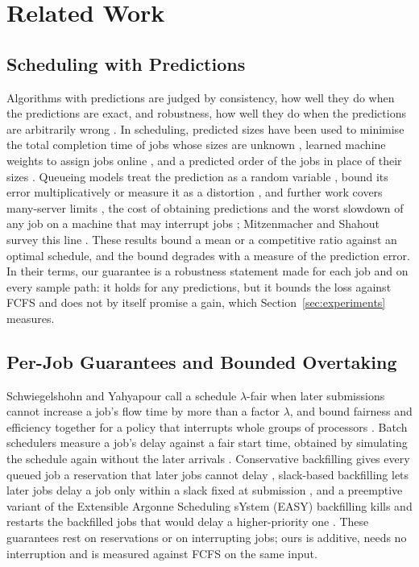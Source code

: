 \section{Related Work}
\label{sec:related}

\subsection{Scheduling with Predictions}

Algorithms with predictions are judged by consistency, how well they do when the
predictions are exact, and robustness, how well they do when the predictions are
arbitrarily wrong \cite{lykouris2021caching,purohit2018predictions}. In scheduling,
predicted sizes have been used to minimise the total completion time of jobs whose sizes
are unknown \cite{im2021nonclairvoyant}, learned machine weights to assign jobs online
\cite{lattanzi2020learnedweights}, and a predicted order of the jobs in place of their
sizes \cite{lindermayr2022permutation}. Queueing models treat the prediction as a random
variable \cite{mitzenmacher2020misprediction}, bound its error multiplicatively
\cite{scully2022uniform} or measure it as a distortion
\cite{azar2021flowtime,azar2022distortion}, and further work covers many-server limits
\cite{dong2025sjf}, the cost of obtaining predictions \cite{shahout2024skippredict} and
the worst slowdown of any job on a machine that may interrupt jobs
\cite{zhao2025fairpredictions}; Mitzenmacher and Shahout survey this line
\cite{mitzenmacher2025queueing}. These results bound a mean or a competitive ratio against
an optimal schedule, and the bound degrades with a measure of the prediction error. In
their terms, our guarantee is a robustness statement made for each job and on every
sample path: it holds for any predictions, but it bounds the loss against FCFS and does
not by itself promise a gain, which Section~\ref{sec:experiments} measures.

\subsection{Per-Job Guarantees and Bounded Overtaking}

Schwiegelshohn and Yahyapour call a schedule $\lambda$-fair when later submissions cannot
increase a job's flow time by more than a factor $\lambda$, and bound fairness and
efficiency together for a policy that interrupts whole groups of processors
\cite{schwiegelshohn2000fairness}. Batch schedulers measure a job's delay against a fair
start time, obtained by simulating the schedule again without the later arrivals
\cite{sabin2004fairness,sabin2005unfairness}. Conservative backfilling gives every queued
job a reservation that later jobs cannot delay \cite{mualem2001backfilling,lindsay2013backfilling},
slack-based backfilling lets later jobs delay a job only within a slack fixed at
submission \cite{talby1999slack}, and a preemptive variant of the Extensible Argonne
Scheduling sYstem (EASY) backfilling \cite{lifka1995easy} kills and restarts the backfilled
jobs that would delay a higher-priority one \cite{yuan2010pveasy}. These guarantees rest on
reservations or on interrupting jobs; ours is additive, needs no interruption and is
measured against FCFS on the same input.

